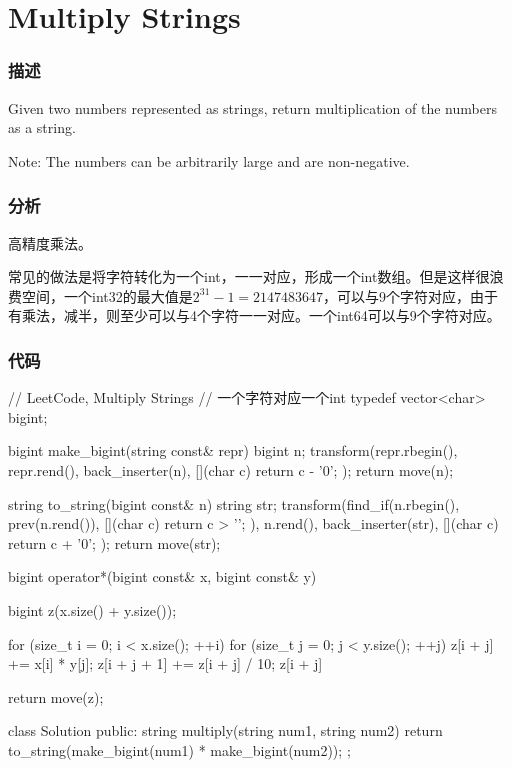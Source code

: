 \section{Multiply Strings} %
\label{sec:multiply-strings}


\subsubsection{描述}
Given two numbers represented as strings, return multiplication of the numbers as a string.

Note: The numbers can be arbitrarily large and are non-negative.


\subsubsection{分析}
高精度乘法。

常见的做法是将字符转化为一个int，一一对应，形成一个int数组。但是这样很浪费空间，一个int32的最大值是$2^{31}-1=2147483647$，可以与9个字符对应，由于有乘法，减半，则至少可以与4个字符一一对应。一个int64可以与9个字符对应。


\subsubsection{代码}

\begin{Code}
// LeetCode, Multiply Strings
// 一个字符对应一个int
typedef vector<char> bigint;

bigint make_bigint(string const& repr) {
    bigint n;
    transform(repr.rbegin(), repr.rend(), back_inserter(n), [](char c) { return c - '0'; });
    return move(n);
}

string to_string(bigint const& n) {
    string str;
    transform(find_if(n.rbegin(), prev(n.rend()), [](char c) { return c > '\0'; }),
              n.rend(), back_inserter(str), [](char c) { return c + '0'; });
    return move(str);
}

bigint operator*(bigint const& x, bigint const& y) {
    bigint z(x.size() + y.size());

    for (size_t i = 0; i < x.size(); ++i)
        for (size_t j = 0; j < y.size(); ++j) {
            z[i + j] += x[i] * y[j];
            z[i + j + 1] += z[i + j] / 10;
            z[i + j] %
        }

    return move(z);
}

class Solution {
public:
    string multiply(string num1, string num2) {
        return to_string(make_bigint(num1) * make_bigint(num2));
    }
};
\end{Code}

